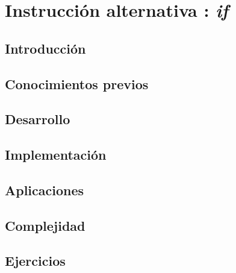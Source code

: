 \chapter{Instrucción alternativa : \emph{if} }
\section{Introducción}

\section{Conocimientos previos}

\section{Desarrollo}

\section{Implementación}

\section{Aplicaciones}

\section{Complejidad}

\section{Ejercicios}
